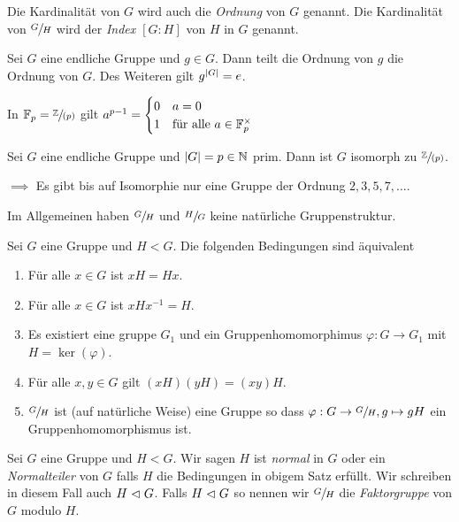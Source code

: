 \begin{definition}
	Die Kardinalität von $G$ wird auch die \emph{Ordnung} von $G$ genannt.
	Die Kardinalität von $\sfrac{G}{H}$ wird der \emph{Index $[G:H]$} von $H$ in $G$ genannt.
\end{definition}


\begin{corollary}
	Sei $G$ eine endliche Gruppe und $g \in G$. Dann teilt die Ordnung von $g$ die Ordnung von $G$.
	Des Weiteren gilt $g^{\abs{G}} = e$.
\end{corollary}


\begin{corollary}
	In $\mathbb{F}_{p} = \sfrac{\mathbb{Z}}{(p)}$ gilt $a^{p-1} = \begin{cases}
		0 &a = 0\\
		1 &\text{für alle } a \in \mathbb{F}_{p}^{\times}
	\end{cases}$
\end{corollary}


\begin{corollary}
	Sei $G$ eine endliche Gruppe und $\abs{G} = p \in \mathbb{N}$ prim. Dann ist $G$ isomorph zu $\sfrac{\mathbb{Z}}{(p)}$.
\end{corollary}


$\implies$ Es gibt bis auf Isomorphie nur eine Gruppe der Ordnung $2,3,5,7,\ldots$.

Im Allgemeinen haben $\sfrac{G}{H}$ und $\sfrac{H}{G}$ keine natürliche Gruppenstruktur.

\begin{theorem}
	Sei $G$ eine Gruppe und $H < G$. Die folgenden Bedingungen sind äquivalent
	\begin{enumerate}[(1)]
		\item Für alle $x \in G$ ist $x H = H x$.
		\item Für alle  $x \in G$ ist $x H x^{-1} = H$.
		\item Es existiert eine gruppe $G_1$ und ein Gruppenhomomorphimus $\varphi: G \to G_1$ mit $H = \ker(\varphi)$.
		\item Für alle $x,y \in G$ gilt $(xH)(yH) = (xy) H$.
		\item $\sfrac{G}{H}$ ist (auf natürliche Weise) eine Gruppe so dass $\varphi: G \to \sfrac{G}{H}, g \mapsto g H$ ein Gruppenhomomorphismus ist.
	\end{enumerate}
\end{theorem}


\begin{definition}
	Sei $G$ eine Gruppe und $H < G$.
	Wir sagen $H$ ist \emph{normal} in $G$ oder ein \emph{Normalteiler} von $G$ falls $H$ die Bedingungen in obigem Satz erfüllt.
	Wir schreiben in diesem Fall auch $H \vartriangleleft G$.
	Falls $H \vartriangleleft G$ so nennen wir $\sfrac{G}{H}$ die \emph{Faktorgruppe} von $G$ modulo $H$.
\end{definition}

